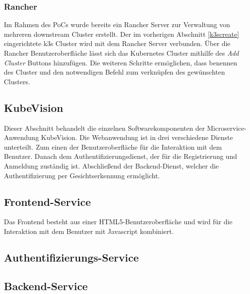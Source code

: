 \subsubsection{Rancher}
Im Rahmen des PoCs wurde bereits ein Rancher Server zur Verwaltung von mehreren downstream Cluster erstellt.
Der im vorherigen Abschnitt \ref{k3screate} eingerichtete k3s Cluster wird mit dem Rancher Server verbunden.
Über die Rancher Benutzeroberfläche lässt sich das Kubernetes Cluster mithilfe des \textit{Add Cluster} Buttons hinzufügen.
Die weiteren Schritte ermöglichen, dass benennen des Cluster und den notwendigen Befehl zum verknüpfen des gewünschten Clusters.

\subsection{KubeVision}
Dieser Abschnitt behandelt die einzelnen Softwarekomponenten der Microservice-Anwendung KubeVision.
Die Webanwendung ist in drei verschiedene Dienste unterteilt.
Zum einen der Benutzeroberfläche für die Interaktion mit dem Benutzer.
Danach dem Authentifizierungsdienst, der für die Registrierung und Anmeldung zuständig ist.
Abschließend der Backend-Dienst, welcher die Authentifizierung per Gesichtserkennung ermöglicht.

\subsection{Frontend-Service}
Das Frontend besteht aus einer HTML5-Benutzeroberfläche und wird für die Interaktion mit dem Benutzer
mit Javascript kombiniert.
\subsection{Authentifizierungs-Service}
\subsection{Backend-Service}



